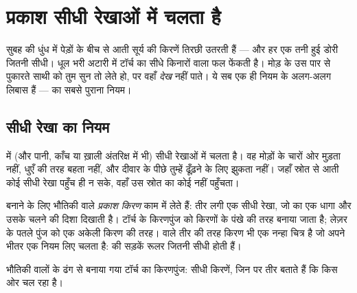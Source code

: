 \chapter{प्रकाश सीधी रेखाओं में चलता है}\label{ch:g4:light-straight-lines}

सुबह की धुंध में पेड़ों के बीच से आती सूर्य की किरणें तिरछी उतरती हैं
--- और हर एक तनी हुई डोरी जितनी सीधी। धूल भरी अटारी में टॉर्च
 का सीधे किनारों वाला फल फेंकती है। मोड़ के उस पार से पुकारते
साथी को तुम सुन तो लेते हो, पर वहाँ \emph{देख} नहीं पाते। ये सब एक ही
नियम के अलग-अलग लिबास हैं ---  का सबसे पुराना नियम।

\section{सीधी रेखा का नियम}

\begin{proposition}[प्रकाश सीधी रेखाओं में चलता है]\label{prop:g4:light-straight-lines:law}
 में (और पानी, काँच या ख़ाली अंतरिक्ष में भी)  सीधी रेखाओं
में चलता है। वह मोड़ों के चारों ओर मुड़ता नहीं, धुएँ की तरह बहता
नहीं, और दीवार के पीछे तुम्हें ढूँढ़ने के लिए झुकता नहीं। जहाँ स्रोत
से आती कोई सीधी रेखा पहुँच ही न सके, वहाँ उस स्रोत का कोई  नहीं
पहुँचता।
\end{proposition}

\begin{definition}[प्रकाश किरण]\label{def:g4:light-straight-lines:ray}
 बनाने के लिए भौतिकी वाले \emph{प्रकाश किरण} काम में लेते हैं: तीर लगी एक सीधी रेखा, जो  का एक धागा
और उसके चलने की दिशा दिखाती है। टॉर्च के किरणपुंज को किरणों के पंखे
की तरह बनाया जाता है; लेज़र के पतले पुंज को एक अकेली किरण की तरह। 
वाले तीर की तरह किरण भी एक नन्हा चित्र है जो अपने भीतर एक नियम लिए
चलता है:  की सड़कें रूलर जितनी सीधी होती हैं।
\end{definition}

\begin{omfigure}

{\small भौतिकी वालों के ढंग से बनाया गया टॉर्च का किरणपुंज: सीधी
किरणें, जिन पर तीर बताते हैं कि  किस ओर चल रहा है।}
\end{omfigure}

